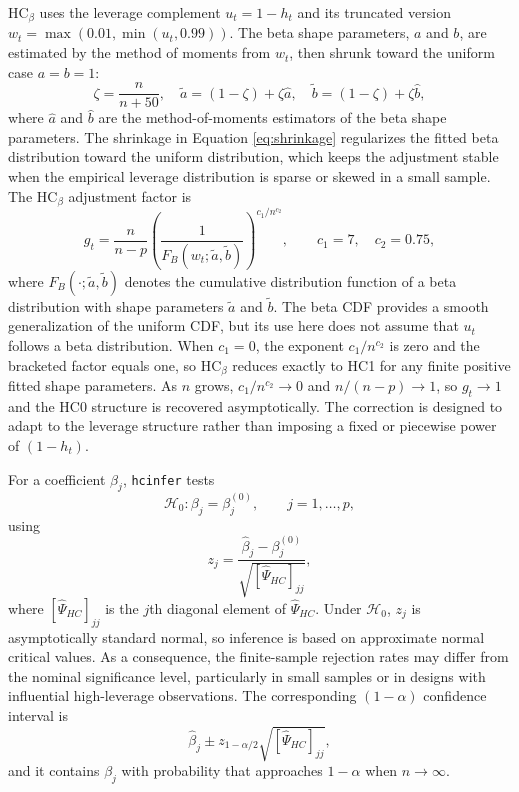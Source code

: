 \(\text{HC}_\beta\) uses the leverage complement \(u_t = 1 - h_t\) and its truncated version \(w_t = \max\left(0.01, \min(u_t, 0.99)\right)\). The beta shape parameters, \(a\) and \(b\), are estimated by the method of moments from \(w_t\), then shrunk toward the uniform case \(a = b = 1\):
\begin{equation}
\zeta = \frac{n}{n+50}, \quad
\tilde{a} = (1-\zeta) + \zeta\hat{a}, \quad
\tilde{b} = (1-\zeta) + \zeta\hat{b},
\label{eq:shrinkage}
\end{equation}
where \(\hat{a}\) and \(\hat{b}\) are the method-of-moments estimators of the beta shape parameters. The shrinkage in Equation \eqref{eq:shrinkage} regularizes the fitted beta distribution toward the uniform distribution, which keeps the adjustment stable when the empirical leverage distribution is sparse or skewed in a small sample. The \(\text{HC}_\beta\) adjustment factor is
\[
g_t =
\frac{n}{n-p}
\left(
\frac{1}{F_B(w_t;\tilde{a},\tilde{b})}
\right)^{c_1/n^{c_2}},
\qquad c_1=7, \quad c_2=0.75,
\]
where \(F_B(\cdot;\tilde{a},\tilde{b})\) denotes the cumulative distribution function of a beta distribution with shape parameters \(\tilde{a}\) and \(\tilde{b}\). The beta CDF provides a smooth generalization of the uniform CDF, but its use here does not assume that \(u_t\) follows a beta distribution. When \(c_1=0\), the exponent \(c_1/n^{c_2}\) is zero and the bracketed factor equals one, so \(\text{HC}_\beta\) reduces exactly to HC1 for any finite positive fitted shape parameters. As \(n\) grows, \(c_1/n^{c_2}\to0\) and \(n/(n-p)\to1\), so \(g_t\to1\) and the HC0 structure is recovered asymptotically. The correction is designed to adapt to the leverage structure rather than imposing a fixed or piecewise power of \((1-h_t)\).

For a coefficient \(\beta_j\), \texttt{hcinfer} tests
\[
\mathcal{H}_0 \colon \beta_j = \beta_j^{(0)}, \qquad j = 1,\ldots,p,
\]
using
\[
z_j =
\frac{\hat\beta_j - \beta_j^{(0)}}
{\sqrt{[\widehat\Psi_{HC}]_{jj}}},
\]
where \([\widehat\Psi_{HC}]_{jj}\) is the \(j\)th diagonal element of \(\widehat{\Psi}_{HC}\). Under \(\mathcal{H}_0\), \(z_j\) is asymptotically standard normal, so inference is based on approximate normal critical values. As a consequence, the finite-sample rejection rates may differ from the nominal significance level, particularly in small samples or in designs with influential high-leverage observations. The corresponding \((1-\alpha)\) confidence interval is
\[
\hat{\beta}_j
\pm
z_{1-\alpha/2}
\sqrt{[\widehat{\Psi}_{HC}]_{jj}},
\]
and it contains \(\beta_j\) with probability that approaches \(1-\alpha\) when \(n \to \infty\).

